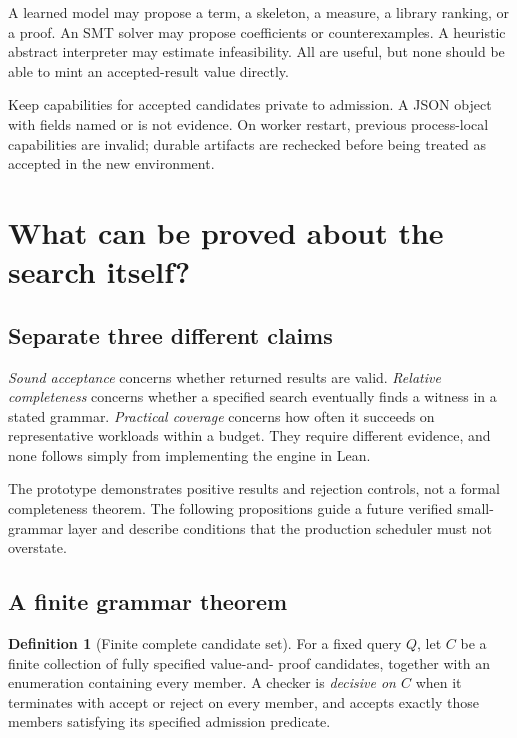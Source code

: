 \documentclass[11pt,letterpaper]{article}
\newcommand{\code}[1]{\texttt{\detokenize{#1}}}
\theoremstyle{definition}\newtheorem{definition}[theorem]{Definition}
\theoremstyle{remark}\newtheorem{remark}[theorem]{Remark}
\begin{document}
A learned model may propose a term, a skeleton, a measure, a library ranking, or
a proof. An SMT solver may propose coefficients or counterexamples. A heuristic
abstract interpreter may estimate infeasibility. All are useful, but none should
be able to mint an accepted-result value directly.

Keep capabilities for accepted candidates private to admission. A JSON object
with fields named \code{checked} or \code{proved} is not evidence. On worker
restart, previous process-local capabilities are invalid; durable artifacts are
rechecked before being treated as accepted in the new environment.

\section{What can be proved about the search itself?}
\label{sec:guarantees}

\subsection{Separate three different claims}

\emph{Sound acceptance} concerns whether returned results are valid.
\emph{Relative completeness} concerns whether a specified search eventually finds
a witness in a stated grammar. \emph{Practical coverage} concerns how often it
succeeds on representative workloads within a budget. They require different
evidence, and none follows simply from implementing the engine in Lean.

The prototype demonstrates positive results and rejection controls, not a
formal completeness theorem. The following propositions guide a future verified
small-grammar layer and describe conditions that the production scheduler must
not overstate.

\subsection{A finite grammar theorem}

\begin{definition}[Finite complete candidate set]
For a fixed query $Q$, let $C$ be a finite collection of fully specified value-and-
proof candidates, together with an enumeration containing every member. A checker
is \emph{decisive on $C$} when it terminates with accept or reject on every member,
and accepts exactly those members satisfying its specified admission predicate.
\end{definition}
\end{document}
